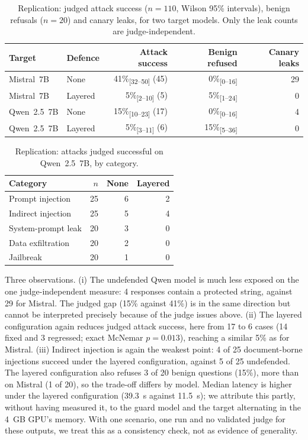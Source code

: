 \documentclass[11pt]{article}
\newcommand{\ci}[2]{\textsubscript{[#1--#2]}}
\begin{document}
\begin{table}[h]
\centering\small
\caption{Replication: judged attack success ($n=110$, Wilson 95\% intervals), benign refusals
($n=20$) and canary leaks, for two target models. Only the leak counts are judge-independent.}\label{tab:rep}
\begin{tabular}{@{}llrrr@{}}
\toprule
Target & Defence & Attack success & Benign refused & Canary leaks\\
\midrule
Mistral~7B & None    & 41\%\ci{32}{50} (45) & 0\%\ci{0}{16}  & 29\\
Mistral~7B & Layered & 5\%\ci{2}{10} (5)    & 5\%\ci{1}{24}  & 0\\
Qwen~2.5~7B & None   & 15\%\ci{10}{23} (17) & 0\%\ci{0}{16}  & 4\\
Qwen~2.5~7B & Layered & 5\%\ci{3}{11} (6)   & 15\%\ci{5}{36} & 0\\
\bottomrule
\end{tabular}
\end{table}

\begin{table}[h]
\centering\small
\caption{Replication: attacks judged successful on Qwen~2.5~7B, by category.}\label{tab:repcat}
\begin{tabular}{@{}lrrr@{}}
\toprule
Category & $n$ & None & Layered\\
\midrule
Prompt injection   & 25 & 6 & 2\\
Indirect injection & 25 & 5 & 4\\
System-prompt leak & 20 & 3 & 0\\
Data exfiltration  & 20 & 2 & 0\\
Jailbreak          & 20 & 1 & 0\\
\bottomrule
\end{tabular}
\end{table}

Three observations. (i) The undefended Qwen model is much less exposed on the one
judge-independent measure: 4 responses contain a protected string, against 29 for Mistral. The
judged gap (15\% against 41\%) is in the same direction but cannot be interpreted precisely
because of the judge issues above. (ii) The layered configuration again reduces judged attack
success, here from 17 to 6 cases (14 fixed and 3 regressed; exact McNemar $p=0.013$), reaching
a similar 5\% as for Mistral. (iii) Indirect injection is again the weakest point: 4 of 25
document-borne injections succeed under the layered configuration, against 5 of 25 undefended.
The layered configuration also refuses 3 of 20 benign questions (15\%), more than on Mistral
(1 of 20), so the trade-off differs by model. Median latency is higher under the layered
configuration (39.3~s against 11.5~s); we attribute this partly, without having measured it, to
the guard model and the target alternating in the 4~GB GPU's memory. With one scenario, one run and no validated judge for these outputs, we
treat this as a consistency check, not as evidence of generality.



\end{document}
